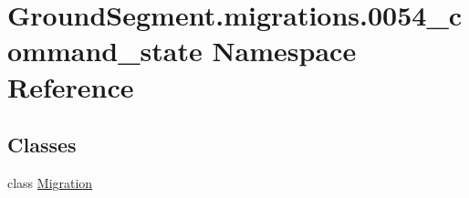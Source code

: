 \hypertarget{namespace_ground_segment_1_1migrations_1_10054__command__state}{}\section{Ground\+Segment.\+migrations.0054\+\_\+command\+\_\+state Namespace Reference}
\label{namespace_ground_segment_1_1migrations_1_10054__command__state}
\subsection*{Classes}
\begin{DoxyCompactItemize}
\item 
class \hyperlink{class_ground_segment_1_1migrations_1_10054__command__state_1_1_migration}{Migration}
\end{DoxyCompactItemize}
